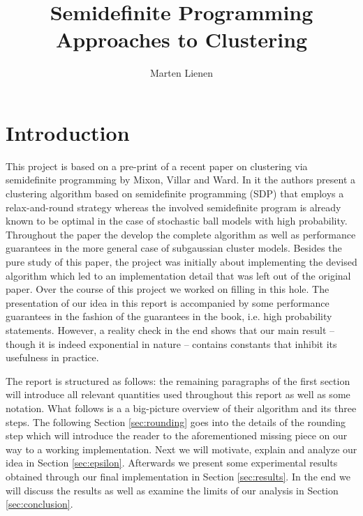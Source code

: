 \documentclass[10pt,a4paper]{article}
\title{Semidefinite Programming Approaches to Clustering}
\author{Marten Lienen}
\date{}
\begin{document}
\maketitle

\section{Introduction}

This project is based on a pre-print of a recent paper on clustering via semidefinite programming \cite{sdp} by Mixon, Villar and Ward.
In it the authors present a clustering algorithm based on semidefinite programming (SDP) that employs a relax-and-round strategy whereas the involved semidefinite program is already known to be optimal in the case of stochastic ball models with high probability.
Throughout the paper the develop the complete algorithm as well as performance guarantees in the more general case of subgaussian cluster models.
Besides the pure study of this paper, the project was initially about implementing the devised algorithm which led to an implementation detail that was left out of the original paper.
Over the course of this project we worked on filling in this hole.
The presentation of our idea in this report is accompanied by some performance guarantees in the fashion of the guarantees in the book, i.e. high probability statements.
However, a reality check in the end shows that our main result -- though it is indeed exponential in nature -- contains constants that inhibit its usefulness in practice.

The report is structured as follows: the remaining paragraphs of the first section will introduce all relevant quantities used throughout this report as well as some notation.
What follows is a a big-picture overview of their algorithm and its three steps.
The following Section \ref{sec:rounding} goes into the details of the rounding step which will introduce the reader to the aforementioned missing piece on our way to a working implementation.
Next we will motivate, explain and analyze our idea in Section \ref{sec:epsilon}.
Afterwards we present some experimental results obtained through our final implementation in Section \ref{sec:results}.
In the end we will discuss the results as well as examine the limits of our analysis in Section \ref{sec:conclusion}.
\end{document}
